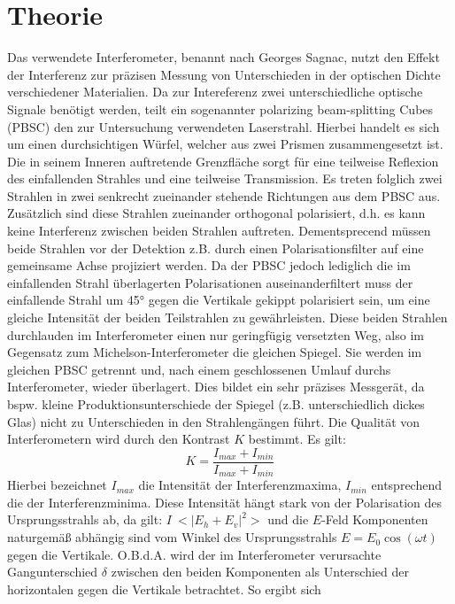   \section{Theorie}
  Das verwendete Interferometer, benannt nach Georges Sagnac, nutzt den Effekt der Interferenz zur präzisen Messung von Unterschieden in der optischen Dichte verschiedener Materialien. Da zur Intereferenz zwei unterschiedliche optische Signale benötigt werden, teilt ein sogenannter polarizing beam-splitting Cubes (PBSC) den zur Untersuchung verwendeten Laserstrahl. Hierbei handelt es sich um einen durchsichtigen Würfel, welcher aus zwei Prismen zusammengesetzt ist. Die in seinem Inneren auftretende Grenzfläche sorgt für eine teilweise Reflexion des einfallenden Strahles und eine teilweise Transmission. Es treten folglich zwei Strahlen in zwei senkrecht zueinander stehende Richtungen aus dem PBSC aus. Zusätzlich sind diese Strahlen zueinander orthogonal polarisiert, d.h. es kann keine Interferenz zwischen beiden Strahlen auftreten. Dementsprecend müssen beide Strahlen vor der Detektion z.B. durch einen Polarisationsfilter auf eine gemeinsame Achse projiziert werden. Da der PBSC jedoch lediglich die im einfallenden Strahl überlagerten Polarisationen auseinanderfiltert muss der einfallende Strahl um 45° gegen die Vertikale gekippt polarisiert sein, um eine gleiche Intensität der beiden Teilstrahlen zu gewährleisten. Diese beiden Strahlen durchlauden im Interferometer einen nur geringfügig versetzten Weg, also im Gegensatz zum Michelson-Interferometer die gleichen Spiegel. Sie werden im gleichen PBSC getrennt und, nach einem geschlossenen Umlauf durchs Interferometer, wieder überlagert. Dies bildet ein sehr präzises Messgerät, da bspw. kleine Produktionsunterschiede der Spiegel (z.B. unterschiedlich dickes Glas) nicht zu Unterschieden in den Strahlengängen führt. Die Qualität von Interferometern wird durch den Kontrast $K$ bestimmt. Es gilt:
  \begin{equation}
  	\label{eq:kontrast}
	K = \frac{I_{max}+I_{min}}{I_{max}+I_{min}}
  \end{equation}
Hierbei bezeichnet $I_{max}$ die Intensität der Interferenzmaxima, $I_{min}$ entsprechend die der Interferenzminima. Diese Intensität hängt stark von der Polarisation des Ursprungsstrahls ab, da gilt: $I~<|E_h+E_v|^2>$ und die $E$-Feld Komponenten naturgemäß abhängig sind vom Winkel des Ursprungsstrahls $E = E_0 \cos (\omega t)$ gegen die Vertikale. O.B.d.A. wird der im Interferometer verursachte Gangunterschied $\delta$ zwischen den beiden Komponenten als Unterschied der horizontalen gegen die Vertikale betrachtet. So ergibt sich
